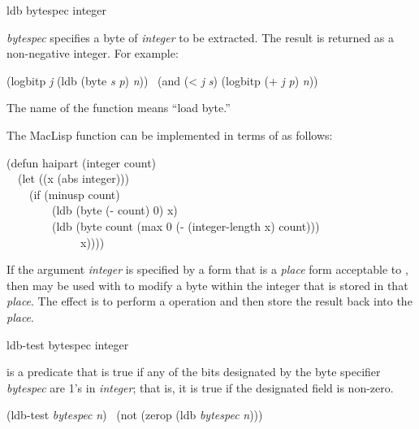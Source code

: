 \begin{defun}[Function]
ldb bytespec integer

{\it bytespec} specifies a byte of {\it integer} to be extracted.
The result is returned as a non-negative integer.
For example:
\begin{lisp}
(logbitp {\it j} (ldb (byte {\it s} {\it p}) {\it n})) \EQ\ (and (< {\it j} {\it s}) (logbitp (+ {\it j} {\it p}) {\it n}))
\end{lisp}
The name of the function  means ``load byte.''

\beforenoterule
\begin{incompatibility}
The MacLisp function  can be
implemented in terms of  as follows:
\begin{lisp}
(defun haipart (integer count) \\
~~(let ((x (abs integer))) \\
~~~~(if (minusp count) \\
~~~~~~~~(ldb (byte (- count) 0) x) \\
~~~~~~~~(ldb (byte count (max 0 (- (integer-length x) count))) \\
~~~~~~~~~~~~~x))))
\end{lisp}
\end{incompatibility}
\afternoterule

If the argument {\it integer} is specified by a form that is a {\it place} form
acceptable to , then
 may be used with  to modify
a byte within the integer that is stored
in that {\it place}.
The effect is to perform a  operation
and then store the result back into the {\it place}.
\end{defun}

\begin{defun}[Function]
ldb-test bytespec integer

 is a predicate that is true if any of
the bits designated by the byte specifier {\it bytespec} are 1's in {\it integer};
that is, it is true if the designated field is non-zero.
\begin{lisp}
(ldb-test {\it bytespec} {\it n}) \EQ\ (not (zerop (ldb {\it bytespec} {\it n})))
\end{lisp}
\end{defun}

